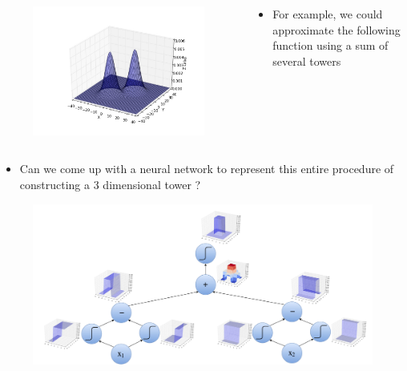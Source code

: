 \begin{frame}
	\begin{columns}
		\begin{overlayarea}{\textwidth}{\textheight}
			\begin{figure}
				\includegraphics[scale=0.25]{images/module5/Plots/2bells}
			\end{figure}
		\end{overlayarea}
		\begin{overlayarea}{\textwidth}{\textheight}
			\begin{itemize}\justifying
				\item For example, we could approximate the following function using a sum of several towers
			\end{itemize}
		\end{overlayarea}
	\end{columns}
\end{frame}

\begin{frame}
	\begin{itemize}\justifying
		\item Can we come up with a neural network to represent this entire procedure of constructing a 3 dimensional tower ?
	\end{itemize}
\end{frame}

\begin{frame}
	\begin{figure}
		\includegraphics[scale=0.3]{images/module5/Plots/nn_step}
	\end{figure}
\end{frame}

